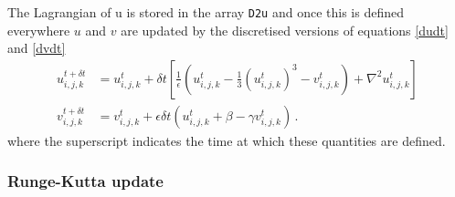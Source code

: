 \documentclass[notitlepage,aps,amsmath,amssymb,11pt]{revtex4-1}
\newcommand{\sqb}[1]{\left[ #1 \right]}
\newcommand{\rndb}[1]{\left( #1 \right)}
\begin{document}
The Lagrangian of u is stored in the array \verb'D2u' and once this is defined everywhere $u$ and $v$ are updated by the discretised versions of equations \eqref{dudt} and \eqref{dvdt} 
\begin{align}
u^{t+\delta t}_{i,j,k} &= u^{t}_{i,j,k} + \delta t \sqb{ \frac{1}{\epsilon} \rndb{u^{t}_{i,j,k} - \frac{1}{3}(u^{t}_{i,j,k})^3 - v^{t}_{i,j,k}} + \nabla^2 u^{t}_{i,j,k}}\\
v^{t+\delta t}_{i,j,k} &= v^{t}_{i,j,k} + \epsilon \delta t \rndb{ u^{t}_{i,j,k} + \beta - \gamma v^{t}_{i,j,k} } \, .
\end{align}
where the superscript indicates the time at which these quantities are defined.

\subsubsection{Runge-Kutta update}
\end{document}
